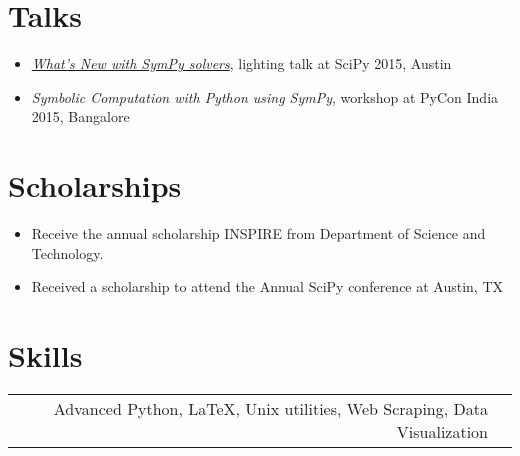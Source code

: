 \documentclass[a4paper,10pt]{article}
\begin{document}
\section{Talks}
\begin{itemize}
    \item \emph{\href{https://www.youtube.com/watch?v=YCxQI4C34j8}{What's New with
        SymPy solvers}}, lighting talk at SciPy 2015, Austin \\
    \item \emph{Symbolic Computation with Python using SymPy}, workshop at PyCon India
        2015, Bangalore
\end{itemize}

\section{Scholarships}
\begin{itemize}
    \item Receive the annual scholarship INSPIRE from Department of Science and Technology.
    \item Received a scholarship to attend the Annual SciPy conference at
    Austin, TX
\end{itemize}



\section{Skills}
\begin{tabular}{rl}
    Advanced Python, \LaTeX, Unix utilities,
     Web Scraping, Data Visualization
\end{tabular}
\end{document}
